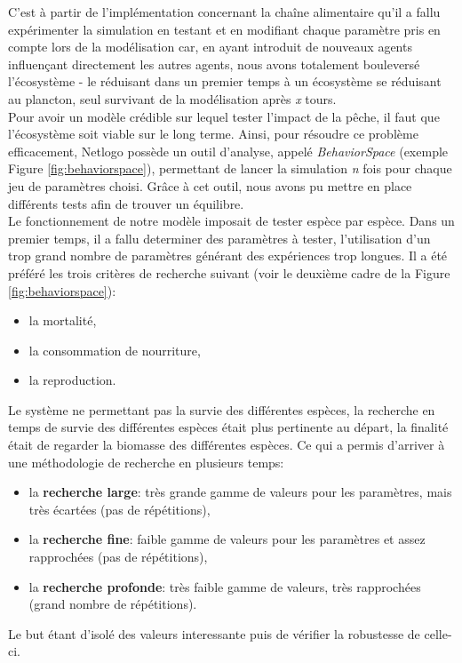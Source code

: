 C'est à partir de l'implémentation concernant la chaîne alimentaire qu'il a fallu expérimenter la simulation en testant et en modifiant chaque paramètre pris en compte lors de la modélisation car, en ayant introduit de nouveaux agents influençant directement les autres agents, nous avons totalement bouleversé l'écosystème - le réduisant dans un premier temps à un écosystème se réduisant au plancton, seul survivant de la modélisation après \textit{x} tours.
\\
Pour avoir un modèle crédible sur lequel tester l'impact de la pêche, il faut que l'écosystème soit viable sur le long terme. Ainsi, pour résoudre ce problème efficacement, Netlogo possède un outil d'analyse, appelé \textit{BehaviorSpace} (exemple Figure \ref{fig:behaviorspace}), permettant de lancer la simulation \textit{n} fois pour chaque jeu de paramètres choisi. Grâce à cet outil, nous avons pu mettre en place différents tests afin de trouver un équilibre.
\\
Le fonctionnement de notre modèle imposait de tester espèce par espèce. Dans un premier temps, il a fallu determiner des paramètres à tester, l'utilisation d'un trop grand nombre de paramètres générant des expériences trop longues. Il a été préféré les trois critères de recherche suivant (voir le deuxième cadre de la Figure \ref{fig:behaviorspace}):
\begin{itemize}
\item{la mortalité,}
\item{la consommation de nourriture,}
\item{la reproduction.}
\end{itemize}
Le système ne permettant pas la survie des différentes espèces, la recherche en temps de survie des différentes espèces était plus pertinente au départ, la finalité était de regarder la biomasse des différentes espèces. Ce qui a permis d'arriver à une méthodologie de recherche en plusieurs temps:
\begin{itemize}
\item{la \textbf{recherche large}: très grande gamme de valeurs pour les paramètres, mais très écartées (pas de répétitions),}
\item{la \textbf{recherche fine}: faible gamme de valeurs pour les paramètres et assez rapprochées (pas de répétitions),}
\item{la \textbf{recherche profonde}: très faible gamme de valeurs, très rapprochées (grand nombre de répétitions).}
\end{itemize}
Le but étant d'isolé des valeurs interessante puis de vérifier la robustesse de celle-ci.
